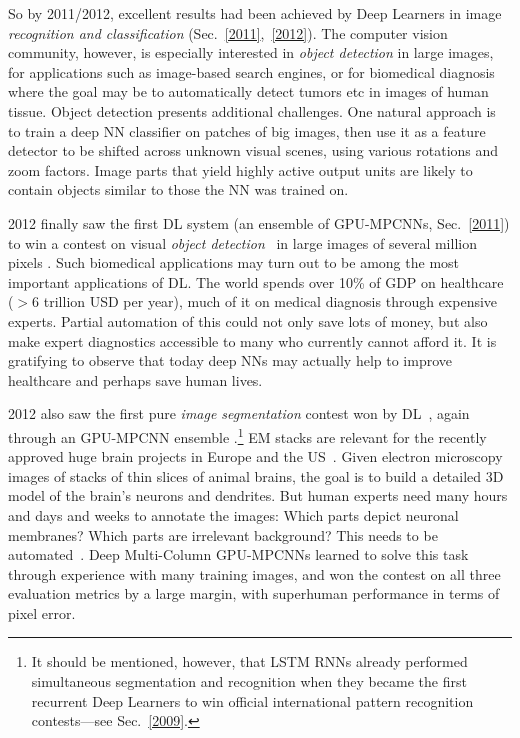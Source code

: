 \documentclass[letterpaper]{article}
\begin{document}
\begin{sloppypar}
So by 2011/2012, excellent results had been achieved by Deep Learners 
in image {\em recognition and classification} (Sec.~\ref{2011},~\ref{2012}).
The computer vision community, however, is especially interested in
 {\em object  detection} in large images,
for applications such as image-based search engines,
or for biomedical diagnosis where the goal may be to 
automatically detect tumors etc in images of human tissue.
Object detection presents additional challenges. 
One natural approach is to train a deep NN classifier on patches of big images,
then use it as a feature detector to be shifted 
across unknown visual scenes, using various rotations and zoom factors.
Image parts that yield highly active output units are likely
to contain objects similar to those the NN was trained on.

2012 finally saw the first DL system 
(an ensemble of GPU-MPCNNs, Sec.~\ref{2011}) to win a
contest on visual {\em object detection}~\citep{miccai2013} in large images of
several million pixels
\citep{icpr12,icpr12report}. 
Such biomedical applications may turn out to be among 
the most important applications of DL.
 The world spends over 10\% of GDP on healthcare ($>6$ trillion USD per year), much of it on medical diagnosis through expensive experts. Partial automation of this could not only save lots of money, but also make expert diagnostics accessible to many who currently cannot afford it.
It is gratifying to observe that today deep NNs may actually help to improve healthcare and 
perhaps save human lives. 


2012 also saw the 
first pure {\em image segmentation} contest won by DL~\citep{ciresan2012nips}, 
again through an GPU-MPCNN ensemble 
\citep{isbi12}.\footnote{It should be mentioned, however, that LSTM RNNs already performed simultaneous segmentation and recognition when they became the first recurrent Deep Learners to win official international pattern recognition contests---see Sec.~\ref{2009}.}
EM stacks are relevant for the recently approved huge brain projects in Europe and the US~\citep[e.g.,][]{markram2012}. Given electron microscopy images of stacks of thin slices of animal brains, the goal is to build a detailed 3D model of the brain's neurons and dendrites. But human experts need many hours and days and weeks to annotate the images: Which parts depict neuronal membranes? Which parts are irrelevant background? This needs to be automated~\citep[e.g.,][]{turaga2010}. Deep Multi-Column GPU-MPCNNs learned to solve this task through experience with many training images, and won the contest on all three evaluation metrics by a large margin, with superhuman performance in terms of pixel error. 


\end{sloppypar}
\end{document}
